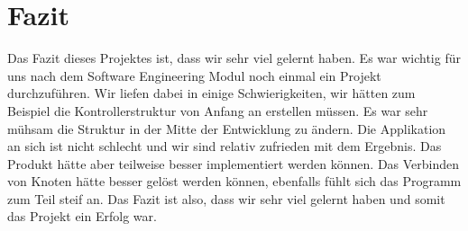 \chapter{Fazit}
\label{chap:fazit}
Das Fazit dieses Projektes ist, dass wir sehr viel gelernt haben. Es war wichtig für uns nach dem Software Engineering Modul noch einmal ein Projekt durchzuführen. Wir liefen dabei in einige Schwierigkeiten, wir hätten zum Beispiel die Kontrollerstruktur von Anfang an erstellen müssen. Es war sehr mühsam die Struktur in der Mitte der Entwicklung zu ändern. Die Applikation an sich ist nicht schlecht und wir sind relativ zufrieden mit dem Ergebnis. Das Produkt hätte aber teilweise besser implementiert werden können. Das Verbinden von Knoten hätte besser gelöst werden können, ebenfalls fühlt sich das Programm zum Teil steif an. Das Fazit ist also, dass wir sehr viel gelernt haben und somit das Projekt ein Erfolg war.